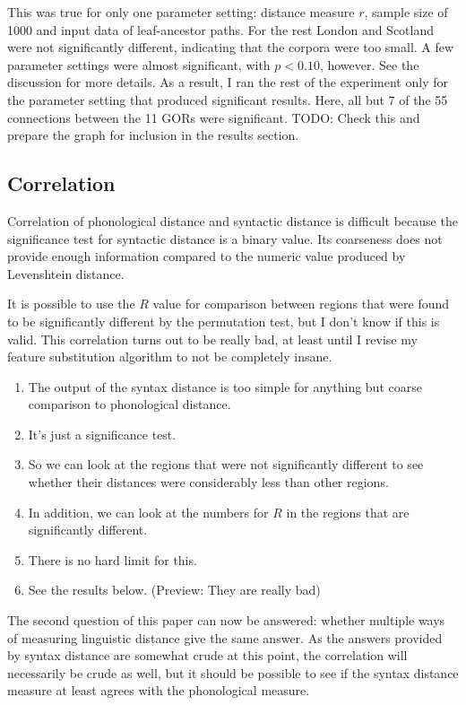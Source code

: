 \documentclass[11pt]{article}
\begin{document}
This was true for only one parameter setting: distance measure $r$,
sample size of 1000 and input data of leaf-ancestor paths. For the
rest London and Scotland were not significantly different, indicating
that the corpora were too small. A few parameter settings were almost
significant, with $p < 0.10$, however. See the discussion for more details.
As a result, I ran the rest of the experiment only for the parameter
setting that produced significant results. Here, all but 7 of the 55
connections between the 11 GORs were significant.
TODO: Check this and prepare the graph for inclusion in the results
section.

\subsection{Correlation}
Correlation of phonological distance and syntactic distance is
difficult because the significance test for syntactic distance is a
binary value. Its coarseness does not provide enough information
compared to the numeric value produced by Levenshtein distance.

It is possible to use the $R$ value for comparison between regions
that were found to be significantly different by the permutation test,
but I don't know if this is valid. This correlation turns out to be really
bad, at least until I revise my feature substitution algorithm to not
be completely insane.

\begin{enumerate}
\item The output of the syntax distance is too simple for anything but
  coarse comparison to phonological distance.
\item It's just a significance test.
\item So we can look at the regions that were not significantly
  different to see whether their distances were considerably less than
  other regions.
\item In addition, we can look at the numbers for $R$ in the regions
  that are significantly different.
\item There is no hard limit for this.
\item See the results below. (Preview: They are really bad)
\end{enumerate}
The second question of this paper can now be answered: whether
multiple ways of measuring linguistic distance give the same
answer. As the answers provided by syntax distance are somewhat crude
at this point, the correlation will necessarily be crude as well, but
it should be possible to see if the syntax distance measure at least
agrees with the phonological measure.
\end{document}
